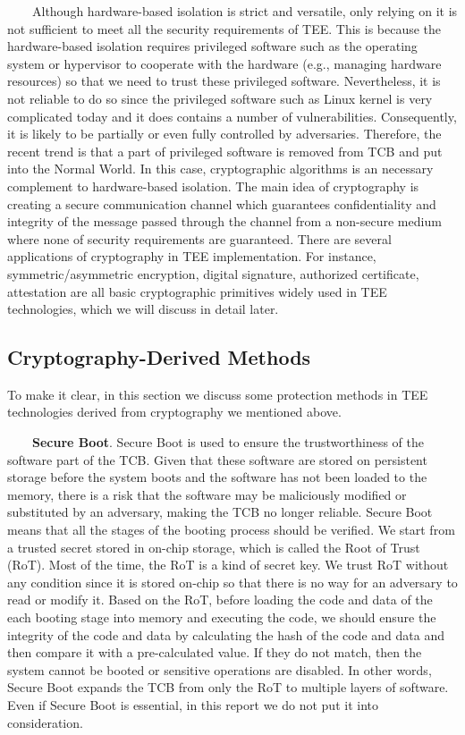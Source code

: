 \documentclass[12pt,twoside]{report}
\begin{document}
\ \ \ \ Although hardware-based isolation is strict and versatile, only relying on it is not sufficient to meet all the security requirements of TEE. This is because the hardware-based isolation requires privileged software such as the operating system or hypervisor to cooperate with the hardware (e.g., managing hardware resources) so that we need to trust these privileged software. Nevertheless, it is not reliable to do so since the privileged software such as Linux kernel is very complicated today and it does contains a number of vulnerabilities. Consequently, it is likely to be partially or even fully controlled by adversaries. Therefore, the recent trend is that a part of privileged software is removed from TCB and put into the Normal World. In this case, cryptographic algorithms is an necessary complement to hardware-based isolation. The main idea of cryptography is creating a secure communication channel which guarantees confidentiality and integrity of the message passed through the channel from a non-secure medium where none of security requirements are guaranteed. There are several applications of cryptography in TEE implementation. For instance, symmetric/asymmetric encryption, digital signature, authorized certificate, attestation are all basic cryptographic primitives widely used in TEE technologies, which we will discuss in detail later.

\subsection{Cryptography-Derived Methods}

To make it clear, in this section we discuss some protection methods in TEE technologies derived from cryptography we mentioned above.

\ \ \ \ \textbf{Secure Boot}. Secure Boot is used to ensure the trustworthiness of the software part of the TCB. Given that these software are stored on persistent storage before the system boots and the software has not been loaded to the memory, there is a risk that the software may be maliciously modified or substituted by an adversary, making the TCB no longer reliable. Secure Boot means that all the stages of the booting process should be verified. We start from a trusted secret stored in on-chip storage, which is called the Root of Trust (RoT). Most of the time, the RoT is a kind of secret key. We trust RoT without any condition since it is stored on-chip so that there is no way for an adversary to read or modify it. Based on the RoT, before loading the code and data of the each booting stage into memory and executing the code, we should ensure the integrity of the code and data by calculating the hash of the code and data and then compare it with a pre-calculated value. If they do not match, then the system cannot be booted or sensitive operations are disabled. In other words, Secure Boot expands the TCB from only the RoT to multiple layers of software. Even if Secure Boot is essential, in this report we do not put it into consideration.
\end{document}
